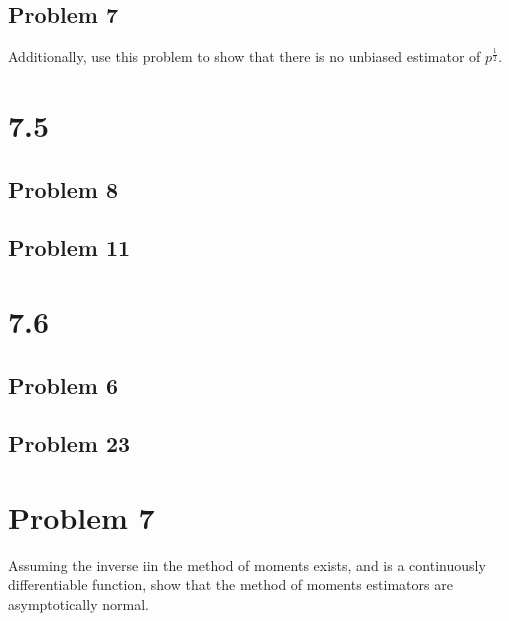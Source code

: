 \documentclass{article}
\begin{document}
\subsection*{Problem 7}
Additionally, use this problem to show that there is no unbiased estimator
of $p^{\frac{1}{2}}$.

\section*{7.5}
\subsection*{Problem 8}
\subsection*{Problem 11}

\section*{7.6}
\subsection*{Problem 6}
\subsection*{Problem 23}

\section*{Problem 7}
Assuming the inverse iin the method of moments exists, and is a continuously
differentiable function, show that the method of moments estimators are
asymptotically normal.
\end{document}

